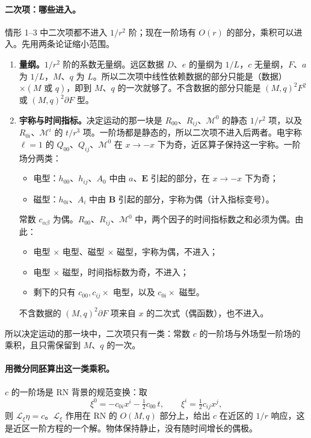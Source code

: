 \documentclass[11pt,a4paper]{ctexart}
\numberwithin{equation}{section}
\begin{document}
\paragraph{二次项：哪些进入。}情形 1--3 中二次项都不进入 $1/r^2$ 阶；现在一阶场有 $O(r)$ 的部分，乘积可以进入。先用两条论证缩小范围。
\begin{enumerate}
\item \textbf{量纲。}$1/r^2$ 阶的系数无量纲。远区数据 $D$、$e$ 的量纲为 $1/L$，$c$ 无量纲，$F$、$a$ 为 $1/L$，$M$、$q$ 为 $L$。所以二次项中线性依赖数据的部分只能是（数据）$\times(M\text{ 或 }q)$，即到 $M$、$q$ 的一次就够了。不含数据的部分只能是 $(M,q)^2F^2$ 或 $(M,q)^2\partial F$ 型。
\item \textbf{宇称与时间指标。}决定运动的那一块是 $R_{00}$、$R_{ij}$、$\mathcal M^0$ 的静态 $1/r^2$ 项，以及 $R_{0i}$、$\mathcal M^i$ 的 $t/r^3$ 项。一阶场都是静态的，所以二次项不进入后两者。电宇称 $\ell=1$ 的 $Q_{00}$、$Q_{ij}$、$\mathcal M^0$ 在 $x\to-x$ 下为奇，近区算子保持这一宇称。一阶场分两类：
\begin{itemize}
\item 电型：$h_{00}$、$h_{ij}$、$A_0$ 中由 $a$、$\boldsymbol E$ 引起的部分，在 $x\to-x$ 下为奇；
\item 磁型：$h_{0i}$、$A_i$ 中由 $\boldsymbol B$ 引起的部分，宇称为偶（计入指标变号）。
\end{itemize}
常数 $c_{\alpha\beta}$ 为偶。$R_{00}$、$R_{ij}$、$\mathcal M^0$ 中，两个因子的时间指标数之和必须为偶。由此：
\begin{itemize}
\item 电型 $\times$ 电型、磁型 $\times$ 磁型，宇称为偶，不进入；
\item 电型 $\times$ 磁型，时间指标数为奇，不进入；
\item 剩下的只有 $c_{00},c_{ij}\times$ 电型，以及 $c_{0i}\times$ 磁型。
\end{itemize}
不含数据的 $(M,q)^2\partial F$ 项来自 $x$ 的二次式（偶函数），也不进入。
\end{enumerate}
所以决定运动的那一块中，二次项只有一类：常数 $c$ 的一阶场与外场型一阶场的乘积，且只需保留到 $M$、$q$ 的一次。

\paragraph{用微分同胚算出这一类乘积。}$c$ 的一阶场是 RN 背景的规范变换：取
\begin{equation}
\xi^0=-c_{0i}x^i-\tfrac12c_{00}\,t,\qquad \xi^i=\tfrac12c_{ij}x^j ,
\label{eq:xic}
\end{equation}
则 $\mathcal L_\xi\eta=c$。$\mathcal L_\xi$ 作用在 RN 的 $O(M,q)$ 部分上，给出 $c$ 在近区的 $1/r$ 响应，这是近区一阶方程的一个解。物体保持静止，没有随时间增长的偶极。
\end{document}
